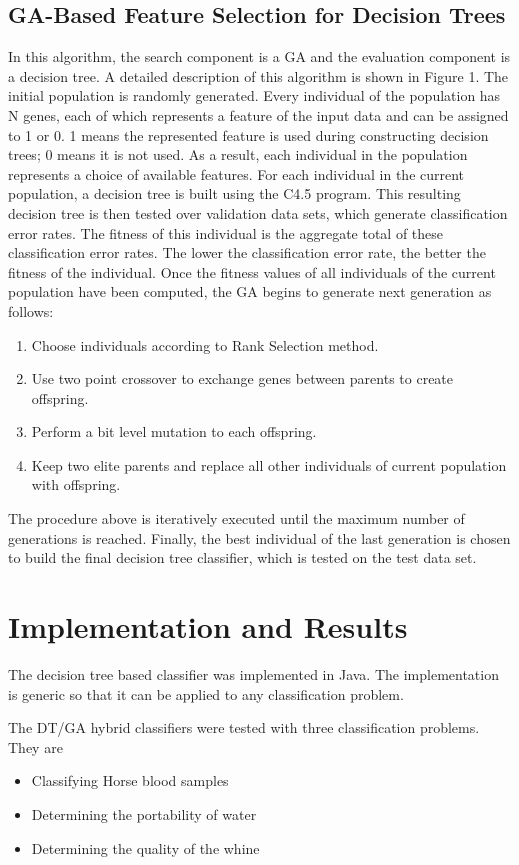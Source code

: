 \documentclass[conference]{IEEEtran}
\begin{document}
\subsection{GA-Based Feature Selection for Decision Trees}
In this algorithm, the search component is a GA and the
evaluation component is a decision tree. A detailed description of
this algorithm is shown in Figure 1. The initial population is
randomly generated. Every individual of the population has N
genes, each of which represents a feature of the input data and
can be assigned to 1 or 0. 1 means the represented feature is used
during constructing decision trees; 0 means it is not used. As a
result, each individual in the population represents a choice of
available features. For each individual in the current population, a
decision tree is built using the C4.5 program. This resulting
decision tree is then tested over validation data sets, which
generate classification error rates. The fitness of this
individual is the aggregate total of these classification error rates.
The lower the classification error rate, the better the fitness of the
individual.
Once the fitness values of all individuals of the current population
have been computed, the GA begins to generate next generation
as follows:
\begin{enumerate}
\item{}Choose individuals according to Rank Selection method.
\item{}Use two point crossover to exchange genes between parents to
create offspring.
\item{}Perform a bit level mutation to each offspring.
\item{}Keep two elite parents and replace all other individuals of
current population with offspring.
\end{enumerate}
The procedure above is iteratively executed until the maximum
number of generations is reached. Finally, the best
individual of the last generation is chosen to build the final
decision tree classifier, which is tested on the test data set.

\section{Implementation and Results}
The decision tree based classifier was implemented in Java. The implementation is generic so that it can be applied to any classification problem.


The DT/GA hybrid classifiers were tested with three classification problems. They are
\begin{itemize}
\item{Classifying Horse blood samples}
\item{Determining the portability of water}
\item{Determining the quality of the whine}
\end{itemize}
\end{document}
